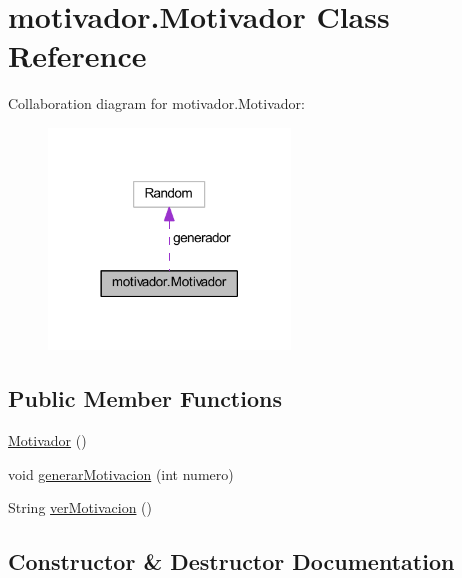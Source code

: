 \hypertarget{classmotivador_1_1_motivador}{}\section{motivador.\+Motivador Class Reference}
\label{classmotivador_1_1_motivador}


Collaboration diagram for motivador.\+Motivador\+:
\nopagebreak
\begin{figure}[H]
\begin{center}
\leavevmode
\includegraphics[width=182pt]{classmotivador_1_1_motivador__coll__graph}
\end{center}
\end{figure}
\subsection*{Public Member Functions}
\begin{DoxyCompactItemize}
\item 
\mbox{\hyperlink{classmotivador_1_1_motivador_abc784d207de9f156051f0f561ef9eaee}{Motivador}} ()
\item 
void \mbox{\hyperlink{classmotivador_1_1_motivador_a60414f3933faaf5fd97ed5c0a2b6d160}{generar\+Motivacion}} (int numero)
\item 
String \mbox{\hyperlink{classmotivador_1_1_motivador_adddea17f72d1be66da740279b742ae3d}{ver\+Motivacion}} ()
\end{DoxyCompactItemize}


\subsection{Constructor \& Destructor Documentation}
\mbox{\label{classmotivador_1_1_motivador_abc784d207de9f156051f0f561ef9eaee}} 
